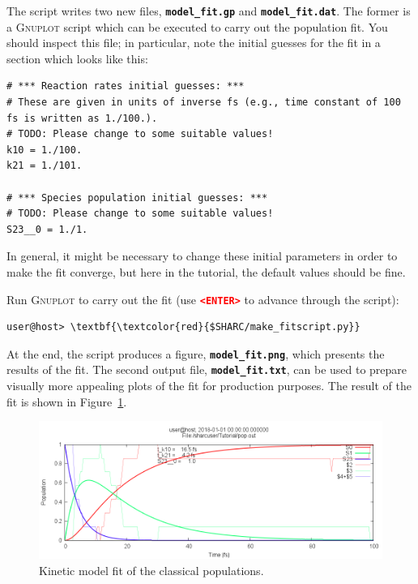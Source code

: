 \documentclass[a4paper,11pt,DIV=15,openany]{scrbook}
\newcommand{\ttt}[1]{\textbf{\texttt{#1}}}
\begin{document}
The script writes two new files, \ttt{model\_fit.gp} and \ttt{model\_fit.dat}.
The former is a \textsc{Gnuplot} script which can be executed to carry out the population fit.
You should inspect this file; in particular, note the initial guesses for the fit in a section which looks like this:
\begin{oframed}
\footnotesize\begin{Verbatim}[commandchars=\\\{\}]
# *** Reaction rates initial guesses: ***
# These are given in units of inverse fs (e.g., time constant of 100 fs is written as 1./100.).
# TODO: Please change to some suitable values!
k10 = 1./100.
k21 = 1./101.

# *** Species population initial guesses: ***
# TODO: Please change to some suitable values!
S23__0 = 1./1.
\end{Verbatim}
\end{oframed}

\normalsize
In general, it might be necessary to change these initial parameters in order to make the fit converge, but here in the tutorial, the default values should be fine.

Run \textsc{Gnuplot} to carry out the fit (use \textcolor{red}{\ttt{<ENTER>}} to advance through the script):
\begin{Verbatim}[commandchars=\\\{\}]
user@host> \textbf{\textcolor{red}{$SHARC/make_fitscript.py}}
\end{Verbatim}
At the end, the script produces a figure, \ttt{model\_fit.png}, which presents the results of the fit.
The second output file, \ttt{model\_fit.txt}, can be used to prepare visually more appealing plots of the fit for production purposes.
The result of the fit is shown in Figure~\ref{fig:model_fit}.

\begin{figure}[ptb]
  \centering
  \includegraphics[width=\textwidth]{figures/model_fit.png}
  \caption{Kinetic model fit of the classical populations.}
  \label{fig:model_fit}
\end{figure}
\end{document}
